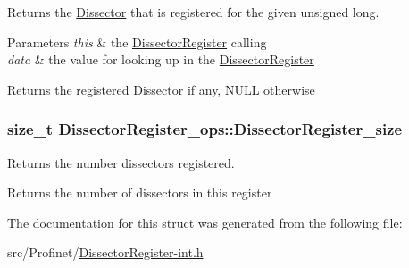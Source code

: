 Returns the \hyperlink{struct_dissector}{Dissector} that is registered for the given unsigned long. 


\begin{DoxyParams}{Parameters}
{\em this} & the \hyperlink{struct_dissector_register}{Dissector\+Register} calling \\
\hline
{\em data} & the value for looking up in the \hyperlink{struct_dissector_register}{Dissector\+Register}\\
\hline
\end{DoxyParams}
\begin{DoxyReturn}{Returns}
the registered \hyperlink{struct_dissector}{Dissector} if any, N\+U\+L\+L otherwise 
\end{DoxyReturn}
\hypertarget{struct_dissector_register__ops_abe25ddc2aed0125710137695861079e6}{}
\subsubsection[{Dissector\+Register\+\_\+size}]{\setlength{\rightskip}{0pt plus 5cm}size\+\_\+t Dissector\+Register\+\_\+ops\+::\+Dissector\+Register\+\_\+size}\label{struct_dissector_register__ops_abe25ddc2aed0125710137695861079e6}


Returns the number dissectors registered. 

\begin{DoxyReturn}{Returns}
the number of dissectors in this register 
\end{DoxyReturn}


The documentation for this struct was generated from the following file\+:\begin{DoxyCompactItemize}
\item 
src/\+Profinet/\hyperlink{_dissector_register-int_8h}{Dissector\+Register-\/int.\+h}\end{DoxyCompactItemize}
